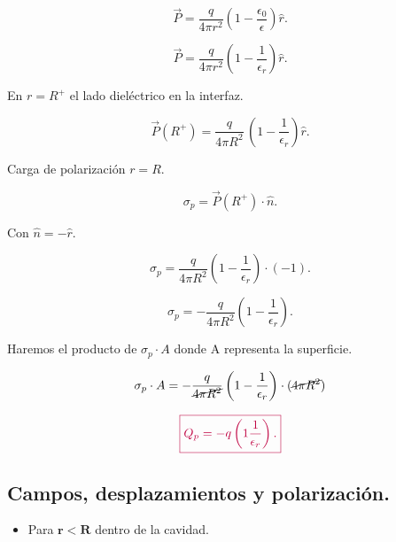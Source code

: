 \documentclass[a4paper,12pt]{article} %
\begin{document}
\[ \vec{P} = \frac{q}{4 \pi r^2} \left( 1 - \frac{\epsilon_0}{\epsilon}\right) \hat{r}. \]

\vspace{\baselineskip}

\[ \vec{P} = \frac{q}{4 \pi r^2} \left( 1 - \frac{1}{\epsilon_r}\right) \hat{r}. \]

\begin{justify}
	En \(r = R^{+}\) el lado dieléctrico en la interfaz.
\end{justify}

\[ \vec{P}\left(R^+\right) = \frac{q}{4\pi R^2} \, \left(1 - \frac{1}{\epsilon_r}\right) \hat{r}. \]

\begin{justify}
	Carga de polarización \(r = R\).
\end{justify}

\[ \sigma_p = \vec{P}\left(R^+\right) \cdot \hat{n}. \]

\begin{justify}
	Con \(\hat{n} = -\hat{r}\).
\end{justify}

\[ \sigma_p = \frac{q}{4 \pi R^2}\left(1 - \frac{1}{\epsilon_r}\right) \cdot \left(-1\right). \]

\vspace{\baselineskip}

\[ \sigma_p = - \frac{q}{4 \pi R^2}\left(1 - \frac{1}{\epsilon_r}\right). \]

\begin{justify}
	Haremos el producto de \( \sigma_p \cdot A\) donde \(\mathrm{A}\) representa la superficie.
\end{justify}

\[ \sigma_p \cdot A = - \frac{q}{ \cancel{4 \pi R^2}}\left(1 - \frac{1}{\epsilon_r}\right) \cdot \left(\cancel{4 \pi R^2}\right) \]

\vspace{\baselineskip}

\[\textcolor{purple}{\boxed{ Q_p = - q \left(1 \frac{1}{\epsilon_r}\right).}}\]


\subsection{Campos, desplazamientos y polarización.}

\begin{justify}
	\begin{itemize}
		\item Para \(\mathbf{r < R}\) dentro de la cavidad.
	\end{itemize}
\end{justify}
\end{document}
